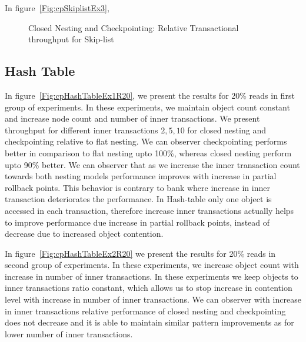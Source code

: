 \documentclass[12pt,english]{report}
\begin{document}
In figure~\ref{Fig:cpSkiplistEx3},

\begin{figure}[H]
\centering
{}
\end{figure}
\begin{figure}[H]
\centering
{}
\end{figure}
\begin{figure}[H]
\centering
{}
\caption{Closed Nesting and Checkpointing: Relative Transactional throughput for Skip-list}
\label{Fig:cpSkiplist}
\end{figure}

\subsection{Hash Table}

In figure~\ref{Fig:cpHashTableEx1R20}, we present the results for 20\% reads in first group of experiments. In these experiments, we maintain object count constant and increase node count and number of inner transactions. We present throughput for different inner transactions ${2, 5, 10}$ for closed nesting and checkpointing relative to flat nesting. We can observer checkpointing performs better in comparison to flat nesting upto 100\%, whereas closed nesting perform upto 90\% better. We can observer that as we increase the inner transaction count towards both nesting models performance improves with increase in partial rollback points. This behavior is contrary to bank where increase in inner transaction deteriorates the performance. In Hash-table only one object is accessed in each transaction, therefore increase inner transactions actually helps to improve performance due increase in partial rollback points, instead of decrease due to increased object contention.

In figure~\ref{Fig:cpHashTableEx2R20} we present the results for 20\% reads in second group of experiments. In these experiments, we increase object count with increase in number of inner transactions. In these experiments we keep objects to inner transactions ratio constant, which allows us to stop increase in contention level with increase in number of inner transactions. We can observer with increase in inner transactions relative performance of closed nesting and checkpointing does not decrease and it is able to maintain similar pattern improvements as for lower number of inner transactions.
\end{document}
